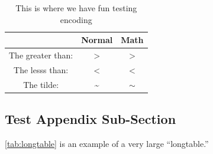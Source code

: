 \begin{table}[H]
	\caption{\label{tab:encoding}This is where we have fun testing encoding}
	\begin{center}
		\begin{tabular}{|c|c|c|}
			\hline
			& Normal & Math \\
			\hline
			The greater than: & > & $>$ \\
			\hline
			The lesss than: & < & $<$ \\
			\hline
			The tilde: & \textasciitilde{} & $\sim$ \\
			\hline
		\end{tabular}
	\end{center}
\end{table}

\subsection{Test Appendix Sub-Section}\label{sec:longtable}
\ref{tab:longtable} is an example of a very large ``longtable.''
